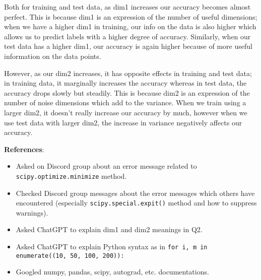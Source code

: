 \documentclass[12pt]{article}
\newcounter{ques}
\newenvironment{question}{\stepcounter{ques}{\noindent\bf Question \arabic{ques}:}}{\vspace{5mm}}
\begin{document}
\begin{question}
Both for training and test data, as dim1 increases our accuracy becomes almost perfect. This is because dim1 is an expression of the number of useful dimensions; when we have a higher dim1 in training, our info on the data is also higher which allows us to predict labels with a higher degree of accuracy. Similarly, when our test data has a higher dim1, our accuracy is again higher because of more useful information on the data points.

However, as our dim2 increases, it has opposite effects in training and test data; in training data, it marginally increases the accuracy whereas in test data, the accuracy drops slowly but steadily. This is because dim2 is an expression of the number of noise dimensions which add to the variance. When we train using a larger dim2, it doesn't really increase our accuracy by much, however when we use test data with larger dim2, the increase in variance negatively affects our accuracy.

\end{question}

\newpage

\textbf{References}:

\quad

\begin{itemize}

\item Asked on Discord group about an error message related to \texttt{scipy.optimize.minimize} method.

\item Checked Discord group messages about the error messages which  others have encountered (especially \texttt{scipy.special.expit()} method and how to suppress warnings).

\item Asked ChatGPT to explain dim1 and dim2 meanings in Q2.

\item Asked ChatGPT to explain Python syntax as in \texttt{for i, m in enumerate((10, 50, 100, 200)):}

\item Googled numpy, pandas, scipy, autograd, etc. documentations.
\end{itemize}
\end{document}
